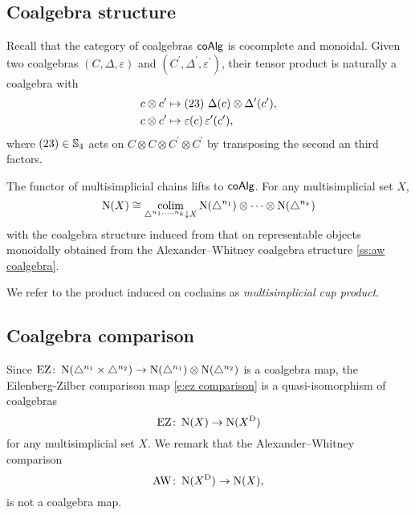 \subsection{Coalgebra structure}

Recall that the category of coalgebras $\coAlg$ is cocomplete and monoidal.
Given two coalgebras $(C, \Delta, \varepsilon)$ and $(C^\prime, \Delta^\prime, \varepsilon^\prime)$, their tensor product is naturally a coalgebra with
\[
\begin{split}
c \ot c^\prime &\mapsto (23) \ \Delta(c) \otimes \Delta^\prime(c^\prime), \\
c \ot c^\prime &\mapsto \varepsilon(c) \, \varepsilon^\prime(c^\prime),
\end{split}
\]
where $(23) \in \S_4$ acts on $C \otimes C \otimes C^\prime \otimes C^\prime$ by transposing the second an third factors.

The functor of multisimplicial chains lifts to $\coAlg$.
For any multisimplicial set $X$,
\[
\chains(X) \cong \colim_{\simplex^{n_1, \dots, n_k} \downarrow X} \chains(\simplex^{n_1}) \ot \dotsb \ot \chains(\simplex^{n_k})
\]
with the coalgebra structure induced from that on representable objects monoidally obtained from the Alexander--Whitney coalgebra structure \cref{ss:aw coalgebra}.

We refer to the product induced on cochains as \textit{multisimplicial cup product}.

\subsection{Coalgebra comparison}

Since $\EZ \colon \chains(\simplex^{n_1} \times \simplex^{n_2}) \to \chains(\simplex^{n_1}) \ot \chains(\simplex^{n_2})$ is a coalgebra map, the Eilenberg-Zilber comparison map \eqref{e:ez comparison} is a quasi-isomorphism of coalgebras
\[
\EZ \colon \chains(X) \to \chains(X^{\diag})
\]
for any multisimplicial set $X$.
We remark that the Alexander--Whitney comparison
\[
\AW \colon \chains(X^{\diag}) \to \chains(X),
\]
is not a coalgebra map.